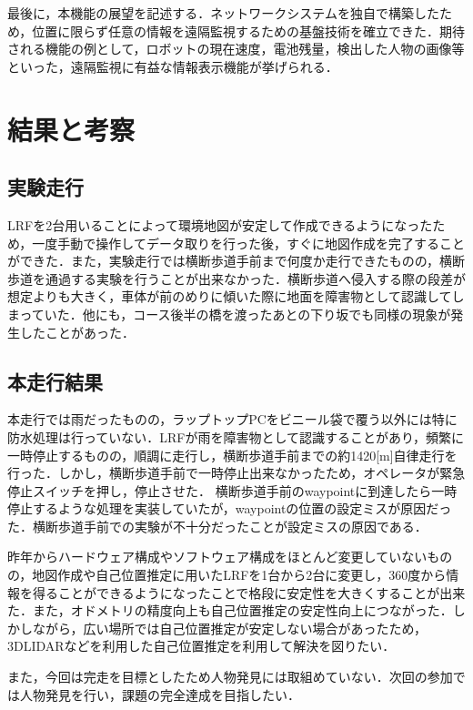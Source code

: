 \documentclass[10pt,a4paper]{jarticle}
\begin{document}
最後に，本機能の展望を記述する．ネットワークシステムを独自で構築したため，位置に限らず任意の情報を遠隔監視するための基盤技術を確立できた．期待される機能の例として，ロボットの現在速度，電池残量，検出した人物の画像等といった，遠隔監視に有益な情報表示機能が挙げられる．

\section{結果と考察}
\subsection{実験走行}
LRFを2台用いることによって環境地図が安定して作成できるようになったため，一度手動で操作してデータ取りを行った後，すぐに地図作成を完了することができた．また，実験走行では横断歩道手前まで何度か走行できたものの，横断歩道を通過する実験を行うことが出来なかった．横断歩道へ侵入する際の段差が想定よりも大きく，車体が前のめりに傾いた際に地面を障害物として認識してしまっていた．他にも，コース後半の橋を渡ったあとの下り坂でも同様の現象が発生したことがあった．

\subsection{本走行結果}
本走行では雨だったものの，ラップトップPCをビニール袋で覆う以外には特に防水処理は行っていない．LRFが雨を障害物として認識することがあり，頻繁に一時停止するものの，順調に走行し，横断歩道手前までの約1420[m]自律走行を行った．しかし，横断歩道手前で一時停止出来なかったため，オペレータが緊急停止スイッチを押し，停止させた．
横断歩道手前のwaypointに到達したら一時停止するような処理を実装していたが，waypointの位置の設定ミスが原因だった．横断歩道手前での実験が不十分だったことが設定ミスの原因である．

昨年からハードウェア構成やソフトウェア構成をほとんど変更していないものの，地図作成や自己位置推定に用いたLRFを1台から2台に変更し，360度から情報を得ることができるようになったことで格段に安定性を大きくすることが出来た．また，オドメトリの精度向上も自己位置推定の安定性向上につながった．しかしながら，広い場所では自己位置推定が安定しない場合があったため，3DLIDARなどを利用した自己位置推定を利用して解決を図りたい．

また，今回は完走を目標としたため人物発見には取組めていない．次回の参加では人物発見を行い，課題の完全達成を目指したい．
\end{document}
